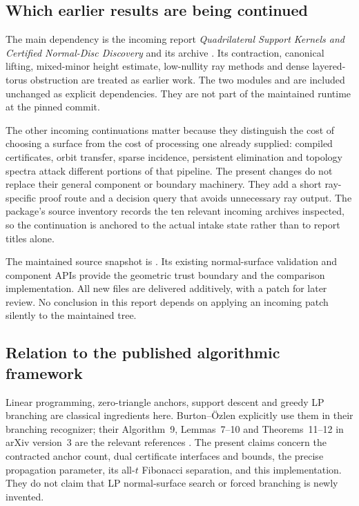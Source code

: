 \subsection{Which earlier results are being continued}

The main dependency is the incoming report \emph{Quadrilateral Support Kernels and Certified Normal-Disc Discovery} and its archive  \cite{priorKernel}. Its contraction, canonical lifting, mixed-minor height estimate, low-nullity ray methods and dense layered-torus obstruction are treated as earlier work. The two modules  and  are included unchanged as explicit dependencies. They are not part of the maintained runtime at the pinned commit.

The other incoming continuations matter because they distinguish the cost of choosing a surface from the cost of processing one already supplied: compiled certificates, orbit transfer, sparse incidence, persistent elimination and topology spectra attack different portions of that pipeline. The present changes do not replace their general component or boundary machinery. They add a short ray-specific proof route and a decision query that avoids unnecessary ray output. The package's source inventory records the ten relevant incoming archives inspected, so the continuation is anchored to the actual intake state rather than to report titles alone.

The maintained source snapshot is \baseline. Its existing normal-surface validation and component APIs provide the geometric trust boundary and the comparison implementation. All new files are delivered additively, with a patch for later review. No conclusion in this report depends on applying an incoming patch silently to the maintained tree.

\subsection{Relation to the published algorithmic framework}

Linear programming, zero-triangle anchors, support descent and greedy LP branching are classical ingredients here. Burton--\"Ozlen explicitly use them in their branching recognizer; their Algorithm~9, Lemmas~7--10 and Theorems~11--12 in arXiv version~3 are the relevant references \cite{BO}. The present claims concern the contracted anchor count, dual certificate interfaces and bounds, the precise propagation parameter, its all-$t$ Fibonacci separation, and this implementation. They do not claim that LP normal-surface search or forced branching is newly invented.

